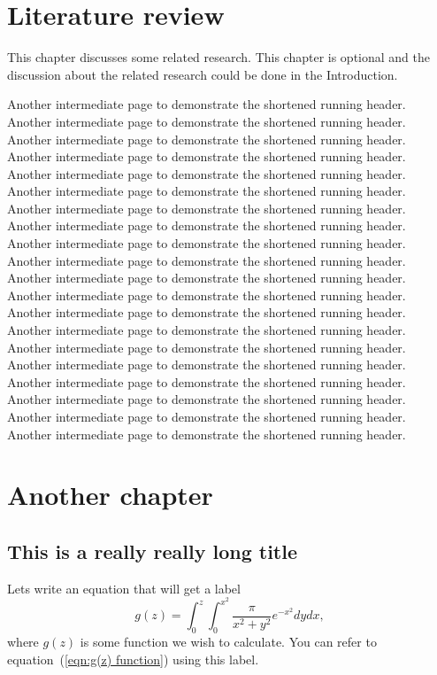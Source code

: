 \chapter{Literature review}

This chapter discusses some  related research.
This chapter is optional and the discussion about
the related research could be done in the Introduction.

Another intermediate page to demonstrate the shortened running header.
Another intermediate page to demonstrate the shortened running header.
Another intermediate page to demonstrate the shortened running header.
Another intermediate page to demonstrate the shortened running header.
Another intermediate page to demonstrate the shortened running header.
Another intermediate page to demonstrate the shortened running header.
Another intermediate page to demonstrate the shortened running header.
Another intermediate page to demonstrate the shortened running header.
Another intermediate page to demonstrate the shortened running header.
Another intermediate page to demonstrate the shortened running header.
Another intermediate page to demonstrate the shortened running header.
Another intermediate page to demonstrate the shortened running header.
Another intermediate page to demonstrate the shortened running header.
Another intermediate page to demonstrate the shortened running header.
Another intermediate page to demonstrate the shortened running header.
Another intermediate page to demonstrate the shortened running header.
Another intermediate page to demonstrate the shortened running header.
Another intermediate page to demonstrate the shortened running header.
Another intermediate page to demonstrate the shortened running header.
Another intermediate page to demonstrate the shortened running header.

\chapter{Another chapter}

\section[My short title]{This is a really really long title}
\label{sec:My short title}

Lets write an equation that will get a label
\begin{equation}
    g(z) = \int_0^z\int_0^{x^2} \frac{\pi}{x^2+y^2} e^{-x^2} dy dx 	,
    \label{eqn:g(z) function}
\end{equation}
where $g(z)$ is some function we wish to calculate.
You can refer to equation~(\ref{eqn:g(z) function}) using this label.

